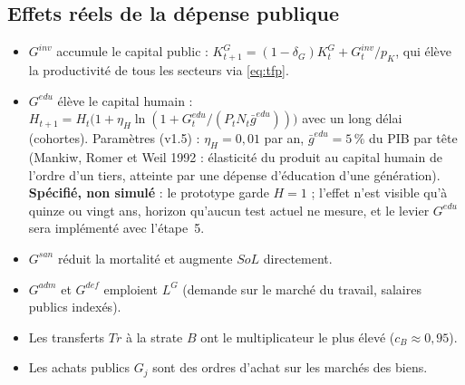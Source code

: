 \documentclass[11pt,a4paper]{article}
\begin{document}
\subsection{Effets réels de la dépense publique}
\begin{itemize}
\item $G^{inv}$ accumule le capital public : $K^G_{t+1} = (1-\delta_G)K^G_t + G^{inv}_t/p_K$, qui élève la productivité de tous les secteurs via \eqref{eq:tfp}.
\item $G^{edu}$ élève le capital humain : $H_{t+1} = H_t\big(1 + \eta_H \ln(1 + G^{edu}_t/(P_t N_t \bar g^{edu}))\big)$ avec un long délai (cohortes). Paramètres (v1.5) : $\eta_H=0{,}01$ par an, $\bar g^{edu}=5\,\%$ du PIB par tête (Mankiw, Romer et Weil 1992 : élasticité du produit au capital humain de l'ordre d'un tiers, atteinte par une dépense d'éducation d'une génération). \textbf{Spécifié, non simulé} : le prototype garde $H=1$ ; l'effet n'est visible qu'à quinze ou vingt ans, horizon qu'aucun test actuel ne mesure, et le levier $G^{edu}$ sera implémenté avec l'étape~5.
\item $G^{san}$ réduit la mortalité et augmente $SoL$ directement.
\item $G^{adm}$ et $G^{def}$ emploient $L^G$ (demande sur le marché du travail, salaires publics indexés).
\item Les transferts $Tr$ à la strate $B$ ont le multiplicateur le plus élevé ($c_B \approx 0{,}95$).
\item Les achats publics $G_j$ sont des ordres d'achat sur les marchés des biens.
\end{itemize}
\end{document}

